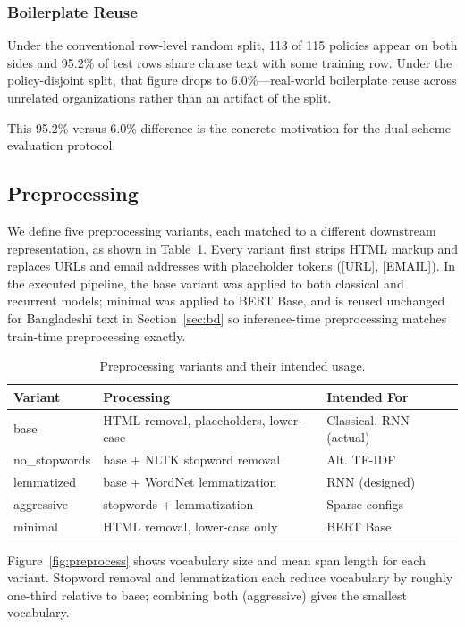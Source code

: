\documentclass[11pt]{article}
\begin{document}
\subsubsection{Boilerplate Reuse}

Under the conventional row-level random split, 113 of 115 policies appear on both sides and 95.2\% of test rows share clause text with some training row. Under the policy-disjoint split, that figure drops to 6.0\%---real-world boilerplate reuse across unrelated organizations rather than an artifact of the split.

This 95.2\% versus 6.0\% difference is the concrete motivation for the dual-scheme evaluation protocol.

\subsection{Preprocessing}

We define five preprocessing variants, each matched to a different downstream representation, as shown in Table~\ref{tab:preprocess}. Every variant first strips HTML markup and replaces URLs and email addresses with placeholder tokens ([URL], [EMAIL]). In the executed pipeline, the base variant was applied to both classical and recurrent models; minimal was applied to BERT Base, and is reused unchanged for Bangladeshi text in Section~\ref{sec:bd} so inference-time preprocessing matches train-time preprocessing exactly.

\begin{table}[t]
\centering
\small
\begin{tabularx}{\columnwidth}{@{}p{1.9cm}XX@{}}
\toprule
\textbf{Variant} & \textbf{Processing} & \textbf{Intended For} \\
\midrule
base & HTML removal, placeholders, lower-case & Classical, RNN (actual) \\
no\_stopwords & base + NLTK stopword removal & Alt. TF-IDF \\
lemmatized & base + WordNet lemmatization & RNN (designed) \\
aggressive & stopwords + lemmatization & Sparse configs \\
minimal & HTML removal, lower-case only & BERT Base \\
\bottomrule
\end{tabularx}
\caption{Preprocessing variants and their intended usage.}
\label{tab:preprocess}
\end{table}

Figure~\ref{fig:preprocess} shows vocabulary size and mean span length for each variant. Stopword removal and lemmatization each reduce vocabulary by roughly one-third relative to base; combining both (aggressive) gives the smallest vocabulary.
\end{document}
